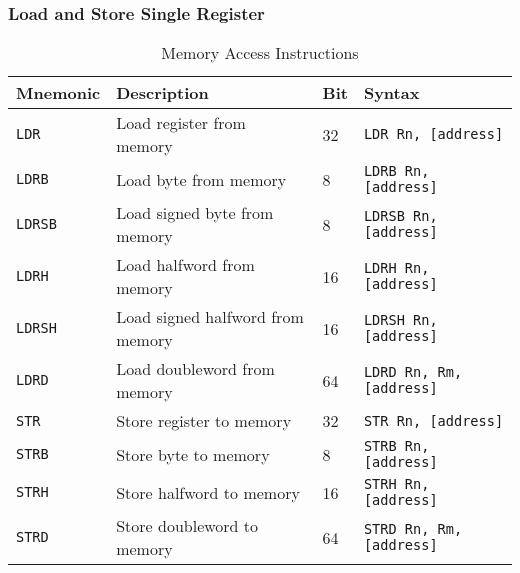 \documentclass[a4paper,12pt,openany]{book}
\begin{document}
\subsubsection{Load and Store Single Register}
\begin{table}[H]
    \centering
    \begin{tabular}{@{}llll@{}}
        \toprule
        Mnemonic & Description & Bit & Syntax \\
        \midrule
        \texttt{LDR} & Load register from memory & 32 & \texttt{LDR Rn, [address]} \\
        \texttt{LDRB} & Load byte from memory & 8 & \texttt{LDRB Rn, [address]} \\
        \texttt{LDRSB} & Load signed byte from memory & 8 & \texttt{LDRSB Rn, [address]} \\
        \texttt{LDRH} & Load halfword from memory & 16 & \texttt{LDRH Rn, [address]} \\
        \texttt{LDRSH} & Load signed halfword from memory & 16 & \texttt{LDRSH Rn, [address]} \\
        \texttt{LDRD} & Load doubleword from memory & 64 & \texttt{LDRD Rn, Rm, [address]} \\
        \texttt{STR} & Store register to memory & 32 & \texttt{STR Rn, [address]} \\
        \texttt{STRB} & Store byte to memory & 8 & \texttt{STRB Rn, [address]} \\
        \texttt{STRH} & Store halfword to memory & 16 & \texttt{STRH Rn, [address]} \\
        \texttt{STRD} & Store doubleword to memory & 64 & \texttt{STRD Rn, Rm, [address]} \\
        \bottomrule
    \end{tabular}
    \label{tab:memory_access_instructions}
    \caption{Memory Access Instructions}
\end{table}
\end{document}
